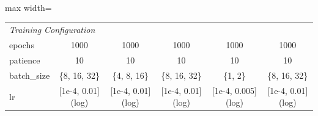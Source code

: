 \begin{table}[H]
\begin{adjustbox}{max width=\textwidth}
\begin{small}
\begin{tabular}{l|ccccc}
\midrule
\multicolumn{6}{l}{\textit{Training Configuration}} \\
epochs & 1000 & 1000 & 1000 & 1000 & 1000 \\
patience & 10 & 10 & 10 & 10 & 10 \\
batch\_size & \{8, 16, 32\} & \{4, 8, 16\} & \{8, 16, 32\} & \{1, 2\} & \{8, 16, 32\} \\
lr & [1e-4, 0.01] (log) & [1e-4, 0.01] (log) & [1e-4, 0.01] (log) & [1e-4, 0.005] (log) & [1e-4, 0.01] (log) \\
\bottomrule
\end{tabular}
\end{small}
\end{adjustbox}
\end{table}